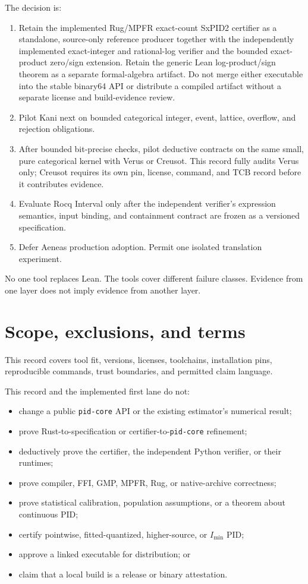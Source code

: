 \documentclass[11pt]{article}
\begin{document}
The decision is:
\begin{enumerate}[leftmargin=*]
  \item Retain the implemented Rug/MPFR exact-count SxPID2 certifier as a standalone, source-only
  reference producer together with the independently implemented exact-integer and rational-log
  verifier and the bounded exact-product zero/sign extension.  Retain the generic Lean
  log-product/sign theorem as a separate formal-algebra artifact.  Do not merge either executable
  into the stable binary64 API or distribute a compiled artifact without a separate license and
  build-evidence review.
  \item Pilot Kani next on bounded categorical integer, event, lattice, overflow, and rejection
  obligations.
  \item After bounded bit-precise checks, pilot deductive contracts on the same small, pure
  categorical kernel with Verus or Creusot.  This record fully audits Verus only; Creusot requires
  its own pin, license, command, and TCB record before it contributes evidence.
  \item Evaluate Rocq Interval only after the independent verifier's expression semantics, input
  binding, and containment contract are frozen as a versioned specification.
  \item Defer Aeneas production adoption.  Permit one isolated translation experiment.
\end{enumerate}

No one tool replaces Lean.  The tools cover different failure classes.  Evidence from one layer
does not imply evidence from another layer.

\section{Scope, exclusions, and terms}

This record covers tool fit, versions, licenses, toolchains, installation pins, reproducible
commands, trust boundaries, and permitted claim language.

This record and the implemented first lane do not:
\begin{itemize}[leftmargin=*]
  \item change a public \texttt{pid-core} API or the existing estimator's numerical result;
  \item prove Rust-to-specification or certifier-to-\texttt{pid-core} refinement;
  \item deductively prove the certifier, the independent Python verifier, or their runtimes;
  \item prove compiler, FFI, GMP, MPFR, Rug, or native-archive correctness;
  \item prove statistical calibration, population assumptions, or a theorem about continuous PID;
  \item certify pointwise, fitted-quantized, higher-source, or \(I_{\min}\) PID;
  \item approve a linked executable for distribution; or
  \item claim that a local build is a release or binary attestation.
\end{itemize}
\end{document}
